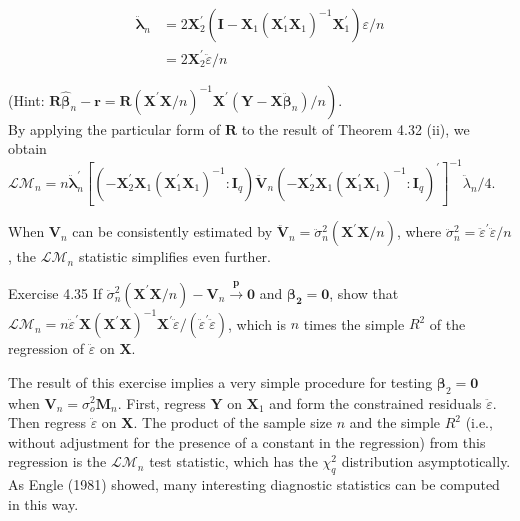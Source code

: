 \documentclass[10pt]{article}
\begin{document}
$$
\begin{aligned}
\ddot{\boldsymbol{\lambda}}_{n} & =2 \mathbf{X}_{2}^{\prime}\left(\mathbf{I}-\mathbf{X}_{1}\left(\mathbf{X}_{1}^{\prime} \mathbf{X}_{1}\right)^{-1} \mathbf{X}_{1}^{\prime}\right) \varepsilon / n \\
& =2 \mathbf{X}_{2}^{\prime} \ddot{\varepsilon} / n
\end{aligned}
$$

(Hint: $\left.\mathbf{R} \hat{\boldsymbol{\beta}}_{n}-\mathbf{r}=\mathbf{R}\left(\mathbf{X}^{\prime} \mathbf{X} / n\right)^{-1} \mathbf{X}^{\prime}\left(\mathbf{Y}-\mathbf{X} \ddot{\boldsymbol{\beta}}_{n}\right) / n\right)$.\\
By applying the particular form of $\mathbf{R}$ to the result of Theorem 4.32 (ii), we obtain\\
$\mathcal{L} \mathcal{M}_{n}=n \ddot{\boldsymbol{\lambda}}_{n}^{\prime}\left[\left(-\mathbf{X}_{2}^{\prime} \mathbf{X}_{1}\left(\mathbf{X}_{1}^{\prime} \mathbf{X}_{1}\right)^{-1}: \mathbf{I}_{q}\right) \ddot{\mathbf{V}}_{n}\left(-\mathbf{X}_{2}^{\prime} \mathbf{X}_{1}\left(\mathbf{X}_{1}^{\prime} \mathbf{X}_{1}\right)^{-1}: \mathbf{I}_{q}\right)^{\prime}\right]^{-1} \ddot{\lambda}_{n} / 4$.

When $\mathbf{V}_{n}$ can be consistently estimated by $\ddot{\mathbf{V}}_{n}=\ddot{\sigma}_{n}^{2}\left(\mathbf{X}^{\prime} \mathbf{X} / n\right)$, where $\ddot{\sigma}_{n}^{2}= \ddot{\varepsilon}^{\prime} \ddot{\varepsilon} / n$, the $\mathcal{L} \mathcal{M}_{n}$ statistic simplifies even further.

Exercise 4.35 If $\ddot{\sigma}_{n}^{2}\left(\mathbf{X}^{\prime} \mathbf{X} / n\right)-\mathbf{V}_{n} \xrightarrow{\boldsymbol{p}} \mathbf{0}$ and $\boldsymbol{\beta}_{\mathbf{2}}=\mathbf{0}$, show that $\mathcal{L} \mathcal{M}_{n}= n \ddot{\varepsilon}^{\prime} \mathbf{X}\left(\mathbf{X}^{\prime} \mathbf{X}\right)^{-1} \mathbf{X}^{\prime} \ddot{\varepsilon} /\left(\ddot{\varepsilon}^{\prime} \ddot{\varepsilon}\right)$, which is $n$ times the simple $R^{2}$ of the regression of $\ddot{\varepsilon}$ on $\mathbf{X}$.

The result of this exercise implies a very simple procedure for testing $\boldsymbol{\beta}_{2}=\mathbf{0}$ when $\mathbf{V}_{n}=\sigma_{o}^{2} \mathbf{M}_{n}$. First, regress $\mathbf{Y}$ on $\mathbf{X}_{1}$ and form the constrained residuals $\ddot{\varepsilon}$. Then regress $\ddot{\varepsilon}$ on $\mathbf{X}$. The product of the sample size $n$ and the simple $R^{2}$ (i.e., without adjustment for the presence of a constant in the regression) from this regression is the $\mathcal{L} \mathcal{M}_{n}$ test statistic, which has the $\chi_{q}^{2}$ distribution asymptotically. As Engle (1981) showed, many interesting diagnostic statistics can be computed in this way.
\end{document}
